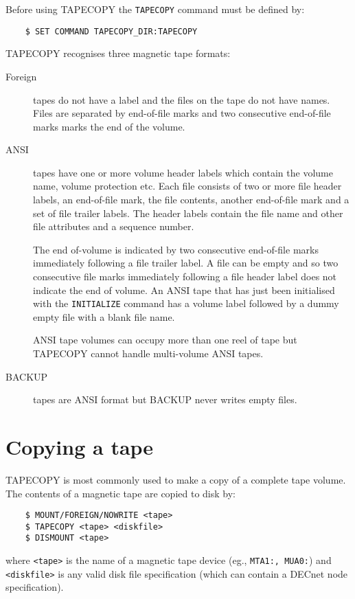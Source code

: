 Before using TAPECOPY the {\tt TAPECOPY} command must be defined by:
\begin{verbatim}
    $ SET COMMAND TAPECOPY_DIR:TAPECOPY
\end{verbatim}

TAPECOPY recognises three magnetic tape formats:
\begin{description}
\item[Foreign] tapes do not have a label and the files on the tape do
not have names. Files are separated by end-of-file marks and two consecutive
end-of-file marks marks the end of the volume.

\item[ANSI] tapes have one or more volume header labels which contain  the
volume name, volume protection etc. Each file consists of two or more file
header labels, an end-of-file
mark, the file contents, another end-of-file mark and a set of file trailer
labels. The header labels contain the file name and other file attributes
and a sequence number.

The end of-volume is indicated by two consecutive end-of-file marks
immediately following a file trailer label. A file can be empty and so two
consecutive file marks immediately following a file header label does not
indicate the end of volume.
An ANSI tape that has just been initialised with the {\tt INITIALIZE} command
has a volume label followed by a dummy empty file with a blank file name.

ANSI tape volumes can occupy more than one reel of tape but TAPECOPY cannot
handle multi-volume ANSI tapes.

\item[BACKUP] tapes are ANSI format but BACKUP never writes empty files.
\end{description}


\section{Copying a tape}

TAPECOPY is most commonly used to make a copy of a complete tape volume.
The contents of a magnetic tape are copied to disk by:
\begin{verbatim}
    $ MOUNT/FOREIGN/NOWRITE <tape>
    $ TAPECOPY <tape> <diskfile>
    $ DISMOUNT <tape>
\end{verbatim}
where {\tt <tape>} is the name of a magnetic tape device (eg., {\tt MTA1:,
MUA0:}) and {\tt <diskfile>} is any valid disk file specification (which can 
contain a DECnet node specification).

